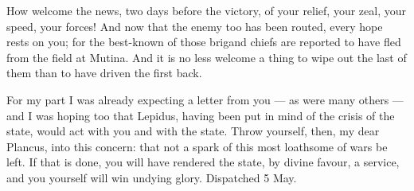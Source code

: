 

 How welcome the news, two days before the victory, of your relief, your zeal, your speed, your forces! And now that the enemy too has been routed, every hope rests on you; for the best-known of those brigand chiefs are reported to have fled from the field at Mutina. And it is no less welcome a thing to wipe out the last of them than to have driven the first back.

 For my part I was already expecting a letter from you --- as were many others --- and I was hoping too that Lepidus, having been put in mind of the crisis of the state, would act with you and with the state. Throw yourself, then, my dear Plancus, into this concern: that not a spark of this most loathsome of wars be left. If that is done, you will have rendered the state, by divine favour, a service, and you yourself will win undying glory. Dispatched 5 May.
